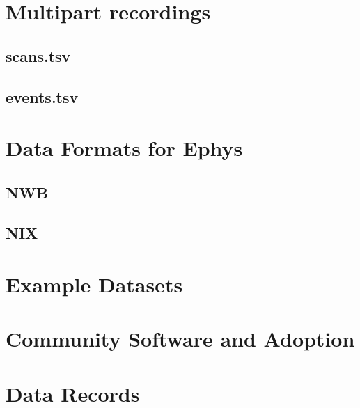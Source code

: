 \documentclass[fleqn,10pt]{wlscirep}
\begin{document}
\section*{Multipart recordings}
\subsection*{scans.tsv}
\subsection*{events.tsv}
\section*{Data Formats for Ephys}
\subsection*{NWB}
\subsection*{NIX}
\section*{Example Datasets}
\section*{Community Software and Adoption}
 

\section*{Data Records}

\end{document}
